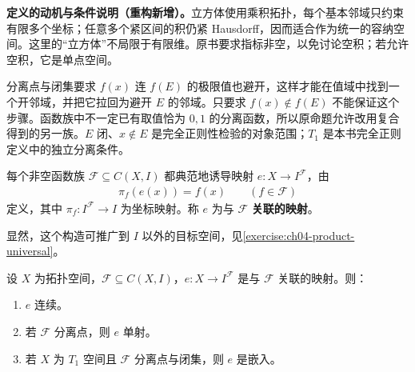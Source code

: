 \documentclass[../../main.tex]{subfiles}
\begin{document}
\begin{remark}
\textbf{定义的动机与条件说明（重构新增）。}立方体使用乘积拓扑，每个基本邻域只约束有限多个坐标；任意多个紧区间的积仍紧 Hausdorff，因而适合作为统一的容纳空间。这里的“立方体”不局限于有限维。原书要求指标非空，以免讨论空积；若允许空积，它是单点空间。

分离点与闭集要求 $f(x)$ 连 $f(E)$ 的极限值也避开，这样才能在值域中找到一个开邻域，并把它拉回为避开 $E$ 的邻域。只要求 $f(x)\notin f(E)$ 不能保证这个步骤。函数族中不一定已有取值恰为 $0,1$ 的分离函数，所以原命题允许改用复合得到的另一族。$E$ 闭、$x\notin E$ 是完全正则性检验的对象范围；$T_1$ 是本书完全正则定义中的独立分离条件。
\end{remark}
\begin{definition}[函数族的关联映射]\label{definition:ch04-associated-cube-map}
每个非空函数族 $\mathcal F\subseteq C(X,I)$ 都典范地诱导映射 $e:X\to I^{\mathcal F}$，由
\begin{align*}
\pi_f(e(x))=f(x)\qquad(f\in\mathcal F)
\end{align*}
定义，其中 $\pi_f:I^{\mathcal F}\to I$ 为坐标映射。称 $e$ 为与 $\mathcal F$ \textbf{关联的映射}。
\end{definition}
显然，这个构造可推广到 $I$ 以外的目标空间，见\cref{exercise:ch04-product-universal}。
\begin{proposition}\label{proposition:ch04-associated-embedding}
设 $X$ 为拓扑空间，$\mathcal F\subseteq C(X,I)$，$e:X\to I^{\mathcal F}$ 是与 $\mathcal F$ 关联的映射。则：
\begin{enumerate}
\item\label{item:ch04-associated-continuous} $e$ 连续。
\item\label{item:ch04-associated-injective} 若 $\mathcal F$ 分离点，则 $e$ 单射。
\item\label{item:ch04-associated-embedding} 若 $X$ 为 $T_1$ 空间且 $\mathcal F$ 分离点与闭集，则 $e$ 是嵌入。
\end{enumerate}
\end{proposition}
\end{document}
